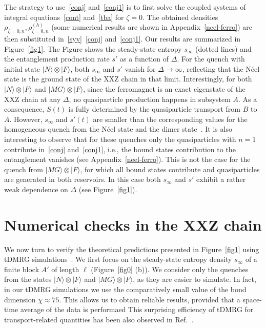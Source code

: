 \documentclass[twocolumn,superscriptaddress,prb,10pt]{revtex4-1}
\begin{document}
The strategy to use~\eqref{conj} and~\eqref{conj1} is to first solve the coupled 
systems of integral equations~\eqref{cont} and~\eqref{tba} for $\zeta=0$. The obtained densities 
$\rho_{\zeta=0,n},\rho_{\zeta=0,n}^{\scriptscriptstyle(h)}$ (some numerical results 
are shown in Appendix~\ref{neel-ferro}) are then substituted 
in~\eqref{syy}~\eqref{conj} and~\eqref{conj1}. Our results are summarized in Figure~\ref{fig1}.  
The Figure  shows the steady-state entropy $s_\infty$ 
(dotted lines) and the entanglement production rate  
$s'$ as a function of $\Delta$. For the quench with initial state $|N\rangle\otimes|
F\rangle$, both $s_\infty$ and $s'$ vanish for $\Delta\to\infty$, reflecting that the N\'eel state 
is the ground state of the XXZ chain in that limit. 
Interestingly, for both $|N\rangle\otimes|F\rangle$ and $|MG\rangle\otimes|F\rangle$, 
since the ferromagnet is an exact eigenstate of the XXZ chain at any $\Delta$, no quasiparticle production 
happens in subsystem $A$. As a consequence, $S(t)$ is fully determined by the quasiparticle 
transport from $B$ to $A$. However, $s_\infty$ and $s'(t)$ are smaller than the corresponding values for 
the homogeneous quench from the N\'eel state and the dimer state~\cite{alba-2016}. 
It is also interesting to observe that for these quenches only the quasiparticles with $n=1$ contribute 
in~\eqref{conj} and~\eqref{conj1}, i.e., the bound states contribution to the entanglement 
vanishes (see Appendix~\ref{neel-ferro}). This is not the case for the quench from 
$|MG\rangle\otimes|F\rangle$, for which all bound states contribute and quasiparticles are generated 
in both reservoirs. In this case both $s_\infty$ and $s'$ 
exhibit a rather weak dependence on $\Delta$ (see Figure~\ref{fig1}). 

\section{Numerical checks in the XXZ chain} 
We now turn to verify the theoretical predictions presented in Figure~\ref{fig1} using tDMRG 
simulations~\cite{white-2004,daley-2004,uli-2005,uli-2011,itensor}. 
We first focus on the steady-state entropy density $s_\infty$ of a finite block $A'$ 
of length $\ell$ (Figure~\ref{fig0} (b)). 
We consider only the quenches from the states $|N\rangle\otimes|F\rangle$ and $|MG\rangle\otimes|F\rangle$, 
as they are easier to simulate. In fact, in our tDMRG simulations we use the 
comparatively small value of the bond dimension $\chi\approx 75$. This allows us to obtain 
reliable results, provided that a space-time average of the data is performaed 
This surprising efficiency of tDMRG for transport-related quantities has been also observed in 
Ref.~. 
\end{document}
